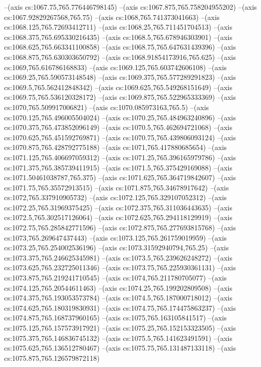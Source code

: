--(axis cs:1067.75,765.776446798145)
--(axis cs:1067.875,765.758204955202)
--(axis cs:1067.92829267568,765.75)
--(axis cs:1068,765.741373041663)
--(axis cs:1068.125,765.72693412711)
--(axis cs:1068.25,765.711451704513)
--(axis cs:1068.375,765.695330216435)
--(axis cs:1068.5,765.678946303901)
--(axis cs:1068.625,765.663341100858)
--(axis cs:1068.75,765.647631439396)
--(axis cs:1068.875,765.630303650792)
--(axis cs:1068.91854173916,765.625)
--(axis cs:1069,765.616786168833)
--(axis cs:1069.125,765.603742606108)
--(axis cs:1069.25,765.590573148548)
--(axis cs:1069.375,765.577289291823)
--(axis cs:1069.5,765.562412848342)
--(axis cs:1069.625,765.549268151649)
--(axis cs:1069.75,765.536120328172)
--(axis cs:1069.875,765.522965333369)
--(axis cs:1070,765.509917006821)
--(axis cs:1070.085973163,765.5)
--(axis cs:1070.125,765.496005504024)
--(axis cs:1070.25,765.484963240896)
--(axis cs:1070.375,765.473852096149)
--(axis cs:1070.5,765.462694721068)
--(axis cs:1070.625,765.451592769871)
--(axis cs:1070.75,765.439806093124)
--(axis cs:1070.875,765.428792775188)
--(axis cs:1071,765.417880685654)
--(axis cs:1071.125,765.406697059312)
--(axis cs:1071.25,765.396165979786)
--(axis cs:1071.375,765.385739411915)
--(axis cs:1071.5,765.375429169088)
--(axis cs:1071.50461038787,765.375)
--(axis cs:1071.625,765.364719842607)
--(axis cs:1071.75,765.35572913515)
--(axis cs:1071.875,765.34678917642)
--(axis cs:1072,765.337910905732)
--(axis cs:1072.125,765.329107052312)
--(axis cs:1072.25,765.31969375425)
--(axis cs:1072.375,765.311036443635)
--(axis cs:1072.5,765.302517126064)
--(axis cs:1072.625,765.294118129919)
--(axis cs:1072.75,765.285842771596)
--(axis cs:1072.875,765.277693815768)
--(axis cs:1073,765.269647437443)
--(axis cs:1073.125,765.261759019959)
--(axis cs:1073.25,765.254002536196)
--(axis cs:1073.31592940794,765.25)
--(axis cs:1073.375,765.246625345981)
--(axis cs:1073.5,765.239626248272)
--(axis cs:1073.625,765.232725011346)
--(axis cs:1073.75,765.225930361131)
--(axis cs:1073.875,765.219241710545)
--(axis cs:1074,765.211780705077)
--(axis cs:1074.125,765.20544611463)
--(axis cs:1074.25,765.199202809508)
--(axis cs:1074.375,765.193053573784)
--(axis cs:1074.5,765.187000718012)
--(axis cs:1074.625,765.180319830931)
--(axis cs:1074.75,765.174475863237)
--(axis cs:1074.875,765.168737960165)
--(axis cs:1075,765.163105841517)
--(axis cs:1075.125,765.157573917921)
--(axis cs:1075.25,765.152153323505)
--(axis cs:1075.375,765.146836745132)
--(axis cs:1075.5,765.141623491591)
--(axis cs:1075.625,765.136512780467)
--(axis cs:1075.75,765.131487133118)
--(axis cs:1075.875,765.126579872118)
